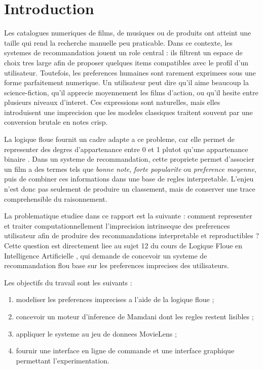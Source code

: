 \section{Introduction}

Les catalogues numeriques de films, de musiques ou de produits ont atteint une taille qui rend la recherche manuelle peu praticable. Dans ce contexte, les systemes de recommandation jouent un role central : ils filtrent un espace de choix tres large afin de proposer quelques items compatibles avec le profil d'un utilisateur. Toutefois, les preferences humaines sont rarement exprimees sous une forme parfaitement numerique. Un utilisateur peut dire qu'il aime beaucoup la science-fiction, qu'il apprecie moyennement les films d'action, ou qu'il hesite entre plusieurs niveaux d'interet. Ces expressions sont naturelles, mais elles introduisent une imprecision que les modeles classiques traitent souvent par une conversion brutale en notes crisp.

La logique floue fournit un cadre adapte a ce probleme, car elle permet de representer des degres d'appartenance entre 0 et 1 plutot qu'une appartenance binaire \cite{zadeh1965,ross2010}. Dans un systeme de recommandation, cette propriete permet d'associer un film a des termes tels que \emph{bonne note}, \emph{forte popularite} ou \emph{preference moyenne}, puis de combiner ces informations dans une base de regles interpretable. L'enjeu n'est donc pas seulement de produire un classement, mais de conserver une trace comprehensible du raisonnement.

La problematique etudiee dans ce rapport est la suivante : comment representer et traiter computationnellement l'imprecision intrinseque des preferences utilisateur afin de produire des recommandations interpretable et reproductibles ? Cette question est directement liee au sujet 12 du cours de Logique Floue en Intelligence Artificielle \cite{kasereka2026}, qui demande de concevoir un systeme de recommandation flou base sur les preferences imprecises des utilisateurs.

Les objectifs du travail sont les suivants :
\begin{enumerate}
  \item modeliser les preferences imprecises a l'aide de la logique floue ;
  \item concevoir un moteur d'inference de Mamdani dont les regles restent lisibles ;
  \item appliquer le systeme au jeu de donnees MovieLens ;
  \item fournir une interface en ligne de commande et une interface graphique permettant l'experimentation.
\end{enumerate}

